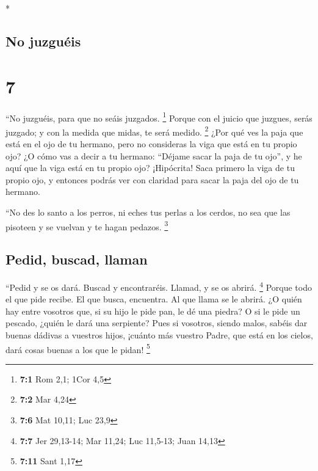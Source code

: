 \begin{paracol}{2}
\begin{otherlanguage}{english}
\end{otherlanguage}

\switchcolumn[0]*

\hypertarget{no-juzguuxe9is}{%
\subsection{No juzguéis}\label{no-juzguuxe9is}}

\hypertarget{section-12}{%
\section{7}\label{section-12}}

 ``No juzguéis, para que no seáis juzgados. \footnote{\textbf{7:1}
  Rom 2,1; 1Cor 4,5}  Porque con el juicio que juzgues,
serás juzgado; y con la medida que midas, te será medido. \footnote{\textbf{7:2}
  Mar 4,24}  ¿Por qué ves la paja que está en el ojo de tu
hermano, pero no consideras la viga que está en tu propio ojo?
 ¿O cómo vas a decir a tu hermano: ``Déjame sacar la paja
de tu ojo'', y he aquí que la viga está en tu propio ojo? 
¡Hipócrita! Saca primero la viga de tu propio ojo, y entonces podrás ver
con claridad para sacar la paja del ojo de tu hermano.

 ``No des lo santo a los perros, ni eches tus perlas a los
cerdos, no sea que las pisoteen y se vuelvan y te hagan pedazos.
\footnote{\textbf{7:6} Mat 10,11; Luc 23,9}

\hypertarget{pedid-buscad-llaman}{%
\subsection{Pedid, buscad, llaman}\label{pedid-buscad-llaman}}

 ``Pedid y se os dará. Buscad y encontraréis. Llamad, y se
os abrirá. \footnote{\textbf{7:7} Jer 29,13-14; Mar 11,24; Luc 11,5-13;
  Juan 14,13}  Porque todo el que pide recibe. El que
busca, encuentra. Al que llama se le abrirá.  ¿O quién hay
entre vosotros que, si su hijo le pide pan, le dé una piedra?
 O si le pide un pescado, ¿quién le dará una serpiente?
 Pues si vosotros, siendo malos, sabéis dar buenas
dádivas a vuestros hijos, ¡cuánto más vuestro Padre, que está en los
cielos, dará cosas buenas a los que le pidan! \footnote{\textbf{7:11}
  Sant 1,17}

\hypertarget{la-regla-de-oro-de-la-caridad}{%
}
\end{paracol}
